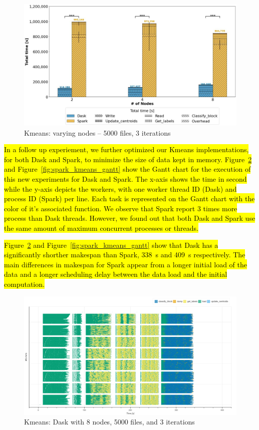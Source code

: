 \documentclass[AMA,STIX1COL]{WileyNJD-v2}
\newcommand{\HL}[1]{\hl{#1}}
\begin{document}
\begin{figure}[!h]
	\centering
	\includegraphics[clip,width=0.75\columnwidth]{figures/stacked_kmeans_worker.jpg}
	\caption{Kmeans: varying nodes -- 5000 files, 3 iterations}
	\label{fig:kmeans_worker}
\end{figure}

\HL{
	In a follow up experiement, we further optimized our Kmeans implementations, for both Dask and Spark, to minimize the size of data kept in memory.
	Figure~{\ref{fig:dask_kmeans_gantt}} and Figure~{\ref{fig:spark_kmeans_gantt}} show the Gantt chart for the execution
	of this new experiments for Dask and Spark.
	The x-axis shows the time in second while the y-axis depicts the workers, with 
	one worker thread ID (Dask) and process ID (Spark) per line.
	Each task is represented on the Gantt chart with the color of it's associated function.
	We observe that Spark report 3 times more process than Dask threads.
	However, we found out that both Dask and Spark use the same amount of maximum concurrent processes or threads.
}

\HL{
	Figure~{\ref{fig:dask_kmeans_gantt}} and Figure~{\ref{fig:spark_kmeans_gantt}}
	show that Dask has a significantly shorther makespan than Spark, {\SI{338}{\second}}
	and {\SI{409}{\second}} respectively.
	The main differences in makespan for Spark appear from a longer initial load of the data
	and a longer scheduling delay between the data load and the initial computation.
}

\begin{figure}[!h]
	\centering
	\includegraphics[clip,width=\columnwidth]{figures/dask_kmeans_gantt.png}
	\caption{Kmeans: Dask with 8 nodes, 5000 files, and 3 iterations}
	\label{fig:dask_kmeans_gantt}
\end{figure}
		
\end{document}
